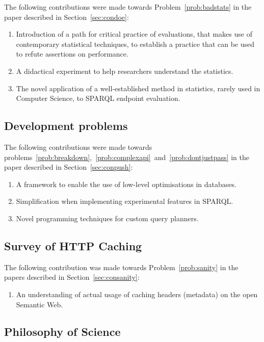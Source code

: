 The following contributions were made towards Problem~\ref{prob:badstats}
in the paper described in Section~\ref{sec:condoe}:


\begin{enumerate}
\item Introduction of a path for critical practice of evaluations, that makes
  use of contemporary statistical techniques, to establish a practice
  that can be used to refute assertions on performance.
\item A didactical experiment to help researchers understand the statistics.
\item The novel application of a well-established method in
  statistics, rarely used in Computer Science, to SPARQL endpoint
  evaluation.
  
\end{enumerate}

\subsection{Development problems}\label{sec:scdev}

The following contributions were made towards
problems~\ref{prob:breakdown},~\ref{prob:complexapi}~and~\ref{prob:dontjustpass}
in the paper described in Section~\ref{sec:conpush}:

\begin{enumerate}
\item A framework to enable the use of low-level optimisations in
  databases.
\item Simplification when implementing experimental features in
  SPARQL.
\item Novel programming techniques for custom query planners.
\end{enumerate}

\subsection{Survey of HTTP Caching}\label{sec:scsurvey}

The following contribution was made towards Problem~\ref{prob:sanity}
in the papers described in Section~\ref{sec:consanity}:

\begin{enumerate}
\item An understanding of actual usage of caching headers (metadata)
  on the open Semantic Web.
\end{enumerate}

\subsection{Philosophy of Science}\label{sec:scphil}

